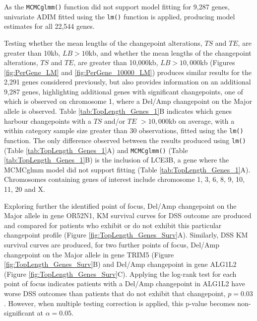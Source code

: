 As the \texttt{MCMCglmm()} function did not support model fitting for 9,287 genes, univariate ADIM fitted using the \texttt{lm()} function is applied, producing model estimates for all 22,544 genes.

Testing whether the mean lengths of the changepoint alterations, $TS$ and $TE$, are greater than 10kb, $LB > 10$kb, and whether the mean lengths of the changepoint alterations, $TS$ and $TE$, are greater than 10,000kb, $LB > 10,000$kb (Figures \ref{fig:PerGene_LM} and \ref{fig:PerGene_10000_LM}) produces similar results for the 2,291 genes considered previously, but also provides information on an additional 9,287 genes, highlighting additional genes with significant changepoints, one of which is observed on chromosome 1, where a Del/Amp changepoint on the Major allele is observed. Table \ref{tab:TopLength_Genes_1}B indicates which genes harbour changepoints with a $TS$ and/or $TE$ $>10,000$kb on average, with a within category sample size greater than 30 observations, fitted using the \texttt{lm()} function. The only difference observed between the results produced using \texttt{lm()} (Table \ref{tab:TopLength_Genes_1}A) and \texttt{MCMCglmm()} (Table \ref{tab:TopLength_Genes_1}B) is the inclusion of LCE3B, a gene where the MCMCglmm model did not support fitting (Table \ref{tab:TopLength_Genes_1}A). Chromosomes containing genes of interest include chromosome 1, 3, 6, 8, 9, 10, 11, 20 and X.

Exploring further the identified point of focus, Del/Amp changepoint on the Major allele in gene OR52N1, KM survival curves for DSS outcome are produced and compared for patients who exhibit or do not exhibit this particular changepoint profile (Figure \ref{fig:TopLength_Genes_Surv}A). Similarly, DSS KM survival curves are produced, for two further points of focus, Del/Amp changepoint on the Major allele in gene TRIM5 (Figure \ref{fig:TopLength_Genes_Surv}B) and Del/Amp changepoint in gene ALG1L2 (Figure \ref{fig:TopLength_Genes_Surv}C). Applying the log-rank test for each point of focus indicates patients with a Del/Amp changepoint in ALG1L2 have worse DSS outcomes than patients that do not exhibit that changepoint, $p = 0.03$. However, when multiple testing correction is applied, this p-value becomes non-significant at $\alpha = 0.05$. 

